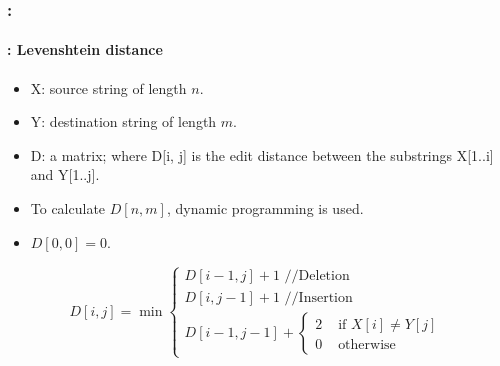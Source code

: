 \documentclass[xcolor=table]{beamer}
\begin{document}
\begin{frame}
	\frametitle{\insertshortsubtitle: \insertsection}
	\framesubtitle{\insertsubsection: Levenshtein distance}

	\begin{itemize}
		\item X: source string of length $n$.
		\item Y: destination string of length $m$.
		\item D: a matrix; where D[i, j] is the edit distance between the substrings X[1..i] and Y[1..j].
		\item To calculate $D[n, m]$, dynamic programming is used.
		\item $D[0, 0] = 0$.
	\end{itemize}
	
	\[
	D[i, j] = \min 
	\begin{cases}
	D[i - 1, j] + 1 \text{ //Deletion}\\
	D[i, j-1] + 1 \text{ //Insertion}\\
	D[i-1, j-1] + \begin{cases}
	2 & \text{ if } X[i] \ne Y[j] \\
	0 & \text{ otherwise}
	\end{cases}
	\end{cases}
	\]

\end{frame}
\end{document}
